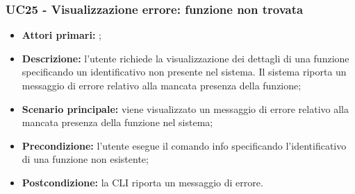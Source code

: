 \subsubsection{UC25 - Visualizzazione errore: funzione non trovata}
\begin{itemize}
	\item \textbf{Attori primari:} \ua{};
	\item \textbf{Descrizione:} l’utente richiede la visualizzazione dei dettagli di una funzione specificando un identificativo non presente nel sistema. Il sistema riporta un messaggio di errore relativo alla mancata presenza della funzione; 
	\item \textbf{Scenario principale:} viene visualizzato un messaggio di errore relativo alla mancata presenza della funzione nel sistema; 
	\item \textbf{Precondizione:} l’utente esegue il comando info specificando l’identificativo di una funzione non esistente; 
	\item \textbf{Postcondizione:} la CLI riporta un messaggio di errore.
\end{itemize}


